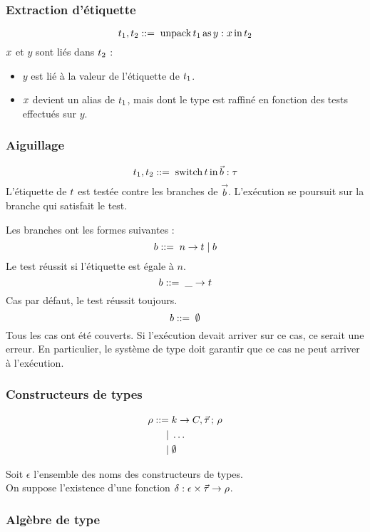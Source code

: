 \subsubsection{Extraction d'étiquette} 

$$t_1, t_2 ::= \; \operatorname{unpack} t_1 \operatorname{as} y : x \operatorname{in} t_2$$
%
$x$ et $y$ sont liés dans $t_2$ :
\begin{itemize}
  \item $y$ est lié à la valeur de l'étiquette de $t_1$.
  \item $x$ devient un alias de $t_1$, mais dont le type est raffiné en
    fonction des tests effectués sur $y$.
\end{itemize}

\subsubsection{Aiguillage} 

$$t_1, t_2 ::= \; \operatorname{switch} t \operatorname{in} \vec{b} : \tau$$
%
L'étiquette de $t$ est testée contre les branches de $\vec{b}$.
L'exécution se poursuit sur la branche qui satisfait le test.

Les branches ont les formes suivantes :
%
$$b ::= \; n \rightarrow t \; | \; b$$
%
Le test réussit si l'étiquette est égale à $n$.
%
$$b ::= \;  \_ \rightarrow t$$
%
Cas par défaut, le test réussit toujours.
%
$$b ::= \; \emptyset$$
%
Tous les cas ont été couverts. Si l'exécution devait arriver sur ce cas, ce
serait une erreur. En particulier, le système de type doit garantir que ce cas
ne peut arriver à l'exécution.

\subsubsection{Constructeurs de types}

\begin{align*}
  \rho ::=& \; k \rightarrow C, \vec{\tau} \,;\, \rho
  \\ |& \; \ldots
  \\ |& \; \emptyset
\end{align*}

Soit $\epsilon$ l'ensemble des noms des constructeurs de types. \\
On suppose l'existence d'une fonction 
$\delta : \epsilon \times \vec{\tau} \to \rho$.


\subsubsection{Algèbre de type}

